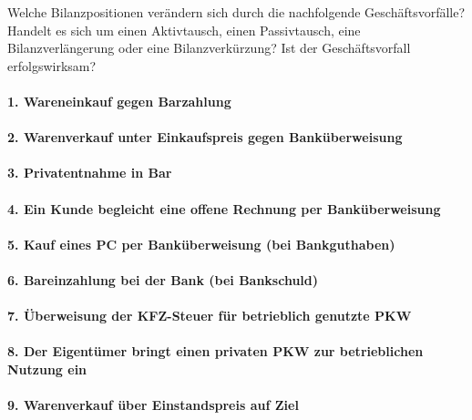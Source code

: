 \documentclass[paper=a4, fontsize=11pt]{scrartcl}
\numberwithin{equation}{section}
\numberwithin{figure}{section}
\numberwithin{table}{section}
\begin{document}
Welche Bilanzpositionen verändern sich durch die nachfolgende Geschäftsvorfälle? Handelt es sich um einen Aktivtausch, einen Passivtausch, eine Bilanzverlängerung oder eine Bilanzverkürzung? Ist der Geschäftsvorfall erfolgswirksam?

\paragraph{1. Wareneinkauf gegen Barzahlung}

\paragraph{2. Warenverkauf unter Einkaufspreis gegen Banküberweisung}

\paragraph{3. Privatentnahme in Bar}

\paragraph{4. Ein Kunde begleicht eine offene Rechnung per Banküberweisung}

\paragraph{5. Kauf eines PC per Banküberweisung (bei Bankguthaben)}

\paragraph{6. Bareinzahlung bei der Bank (bei Bankschuld)}

\paragraph{7. Überweisung der KFZ-Steuer für betrieblich genutzte PKW}

\paragraph{8. Der Eigentümer bringt einen privaten PKW zur betrieblichen Nutzung ein}

\paragraph{9. Warenverkauf über Einstandspreis auf Ziel}
\end{document}
